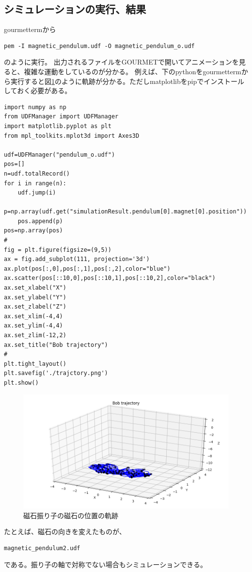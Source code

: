\documentclass[a4paper,11pt]{jarticle}
\begin{document}
\subsection{シミュレーションの実行、結果}

gourmettermから
\begin{verbatim}
pem -I magnetic_pendulum.udf -O magnetic_pendulum_o.udf
\end{verbatim}
のように実行。
出力されるファイルをGOURMETで開いてアニメーションを見ると、複雑な運動をしているのが分かる。
例えば、下のpythonをgourmettermから実行すると図\ref{fig:trajectory}のように軌跡が分かる。ただしmatplotlibをpipでインストールしておく必要がある。

\begin{verbatim}
import numpy as np
from UDFManager import UDFManager
import matplotlib.pyplot as plt
from mpl_toolkits.mplot3d import Axes3D

udf=UDFManager("pendulum_o.udf")
pos=[]
n=udf.totalRecord()
for i in range(n):
    udf.jump(i)
    p=np.array(udf.get("simulationResult.pendulum[0].magnet[0].position"))
    pos.append(p)
pos=np.array(pos)
#
fig = plt.figure(figsize=(9,5))
ax = fig.add_subplot(111, projection='3d')
ax.plot(pos[:,0],pos[:,1],pos[:,2],color="blue")
ax.scatter(pos[::10,0],pos[::10,1],pos[::10,2],color="black")
ax.set_xlabel("X")
ax.set_ylabel("Y")
ax.set_zlabel("Z")
ax.set_xlim(-4,4)
ax.set_ylim(-4,4)
ax.set_zlim(-12,2)
ax.set_title("Bob trajectory")
#
plt.tight_layout()
plt.savefig('./trajctory.png')
plt.show()
\end{verbatim}

\begin{figure}[h]
\centering
  \includegraphics[clip,width=0.7\linewidth]{trajectory.png}
  \caption{磁石振り子の磁石の位置の軌跡
  }
  \label{fig:trajectory}
\end{figure}

たとえば、磁石の向きを変えたものが、
\begin{verbatim}
magnetic_pendulum2.udf
\end{verbatim}
である。振り子の軸で対称でない場合もシミュレーションできる。
\end{document}
